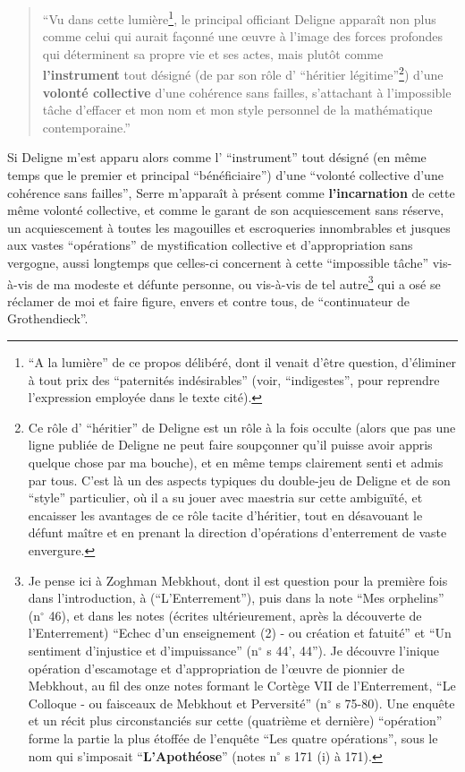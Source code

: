 \begin{quote}
    ``Vu dans cette lumière\footnote{``A la lumière'' de ce propos délibéré, dont il venait d'être question, d'éliminer à tout prix des ``paternités indésirables'' (voir, ``indigestes'', pour reprendre l'expression employée dans le texte cité).}, le principal officiant Deligne apparaît non plus comme celui qui aurait façonné une œuvre à l'image des forces profondes qui déterminent sa propre vie et ses actes, mais plutôt comme \textbf{l'instrument} tout désigné (de par son rôle d' ``héritier légitime''\footnote{Ce rôle d' ``héritier'' de Deligne est un rôle à la fois occulte (alors que pas une ligne publiée de Deligne ne peut faire soupçonner qu'il puisse avoir appris quelque chose par ma bouche), et en même temps clairement senti et admis par tous. C'est là un des aspects typiques du double-jeu de Deligne et de son ``style'' particulier, où il a su jouer avec maestria sur cette ambiguïté, et encaisser les avantages de ce rôle tacite d'héritier, tout en désavouant le défunt maître et en prenant la direction d'opérations d'enterrement de vaste envergure.}) d'une \textbf{volonté collective} d'une cohérence sans failles, s'attachant à l'impossible tâche d'effacer et mon nom et mon style personnel de la mathématique contemporaine.''
\end{quote}

Si Deligne m'est apparu alors comme l' ``instrument'' tout désigné (en même temps que le premier et principal ``bénéficiaire'') d'une ``volonté collective d'une cohérence sans failles'', Serre m'apparaît à présent comme \textbf{l'incarnation} de cette même volonté collective, et comme le garant de son acquiescement sans réserve, un acquiescement à toutes les magouilles et escroqueries innombrables et jusques aux vastes ``opérations'' de mystification collective et d'appropriation sans vergogne, aussi longtemps que celles-ci concernent à cette ``impossible tâche'' vis-à-vis de ma modeste et défunte personne, ou vis-à-vis de tel autre\footnote{Je pense ici à Zoghman Mebkhout, dont il est question pour la première fois dans l'introduction, à (``L'Enterrement''), puis dans la note ``Mes orphelins'' (n$^{\circ}$ 46), et dans les notes (écrites ultérieurement, après la découverte de l'Enterrement) ``Echec d'un enseignement (2) - ou création et fatuité'' et ``Un sentiment d'injustice et d'impuissance'' (n$^{\circ}$ s 44', 44''). Je découvre l'inique opération d'escamotage et d'appropriation de l'œuvre de pionnier de Mebkhout, au fil des onze notes formant le Cortège VII de l'Enterrement, ``Le Colloque - ou faisceaux de Mebkhout et Perversité'' (n$^{\circ}$ s 75-80). Une enquête et un récit plus circonstanciés sur cette (quatrième et dernière) ``opération'' forme la partie la plus étoffée de l'enquête ``Les quatre opérations'', sous le nom qui s'imposait ``\textbf{L'Apothéose}'' (notes n$^{\circ}$ s 171 (i) à 171).} qui a osé se réclamer de moi et faire figure, envers et contre tous, de ``continuateur de Grothendieck''.

